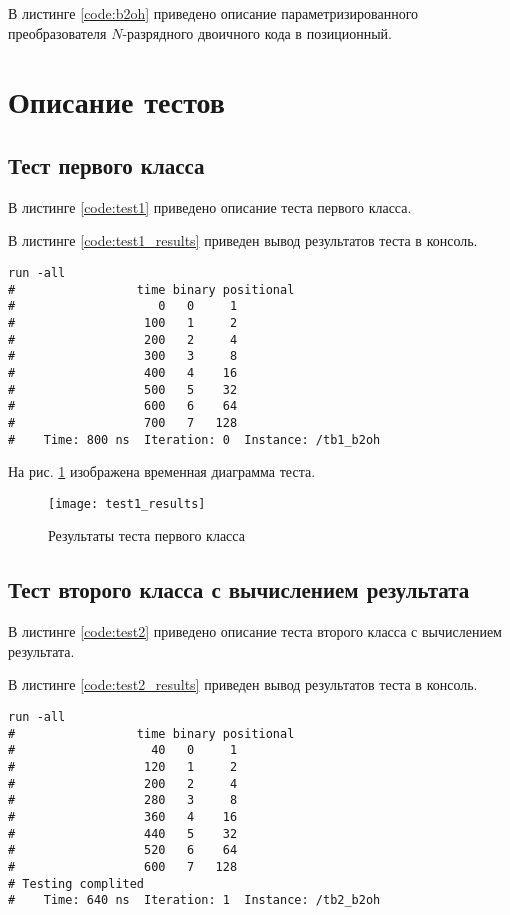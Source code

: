 В листинге \ref{code:b2oh} приведено описание параметризированного преобразователя $N$-разрядного двоичного кода в позиционный.


\section{Описание тестов}
\label{sec:tests}

\subsection{Тест первого класса}

В листинге \ref{code:test1} приведено описание теста первого класса.


В листинге \ref{code:test1_results} приведен вывод результатов теста в консоль.
\begin{lstlisting}[caption=Результаты теста первого класса, label=code:test1_results, language={}]
run -all
# 		          time binary positional
#                    0   0     1
#                  100   1     2
#                  200   2     4
#                  300   3     8
#                  400   4    16
#                  500   5    32
#                  600   6    64
#                  700   7   128
#    Time: 800 ns  Iteration: 0  Instance: /tb1_b2oh
\end{lstlisting}

На рис. \ref{fig:test1_results} изображена временная диаграмма теста.
\begin{figure}[H]
	\begin{center}
		\texttt{[image: test1\_results]}
		\caption{Результаты теста первого класса}
		\label{fig:test1_results}
	\end{center}
\end{figure}
\vspace{-1cm}

\subsection{Тест второго класса с вычислением результата}

В листинге \ref{code:test2} приведено описание теста второго класса с вычислением результата.


В листинге \ref{code:test2_results} приведен вывод результатов теста в консоль.
\begin{lstlisting}[caption=Результаты теста второго класса с вычислением результата, label=code:test2_results, language={}]
run -all
# 		          time binary positional
#                   40   0     1
#                  120   1     2
#                  200   2     4
#                  280   3     8
#                  360   4    16
#                  440   5    32
#                  520   6    64
#                  600   7   128
# Testing complited
#    Time: 640 ns  Iteration: 1  Instance: /tb2_b2oh
\end{lstlisting}

